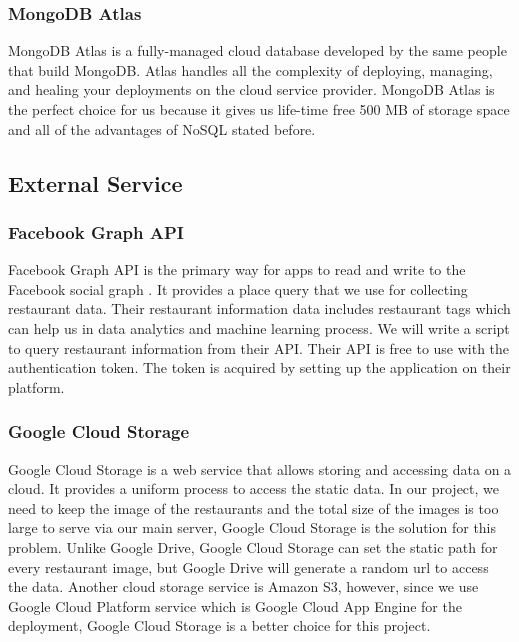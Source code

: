 \documentclass[12pt,oneside,openright,a4paper]{cpe-english-project}
\begin{document}
\subsubsection{MongoDB Atlas}

MongoDB Atlas is a fully-managed cloud database developed by the same people that build MongoDB. Atlas handles all the complexity of deploying, managing, and healing your deployments on the cloud service provider. \cite{MongoDBAtlas} MongoDB Atlas is the perfect choice for us because it gives us life-time free 500 MB of storage space and all of the advantages of NoSQL stated before.


\subsection{External Service}

\subsubsection{Facebook Graph API}

Facebook Graph API is the primary way for apps to read and write to the Facebook social graph \cite{GraphAPI}. It provides a place query that we use for collecting restaurant data. Their restaurant information data includes restaurant tags which can help us in data analytics and machine learning process. We will write a script to query restaurant information from their API. Their API is free to use with the authentication token. The token is acquired by setting up the application on their platform.

\subsubsection{Google Cloud Storage}

Google Cloud Storage is a web service that allows storing and accessing data on a cloud. It provides a uniform process to access the static data. In our project, we need to keep the image of the restaurants and the total size of the images is too large to serve via our main server, Google Cloud Storage is the solution for this problem. Unlike Google Drive, Google Cloud Storage can set the static path for every restaurant image, but Google Drive will generate a random url to access the data. Another cloud storage service is Amazon S3, however, since we use Google Cloud Platform service which is Google Cloud App Engine for the deployment, Google Cloud Storage is a better choice for this project.
\end{document}
